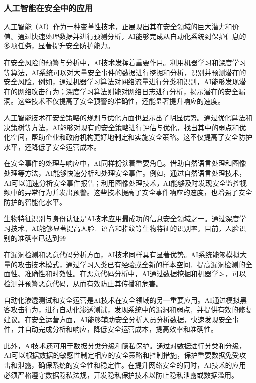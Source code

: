 \subsubsection{人工智能在安全中的应用}

人工智能（AI）作为一种变革性技术，正展现出其在安全领域的巨大潜力和价值。通过快速处理数据并进行预测分析，AI能够完成从自动化系统到保护信息的多项任务，显著提升安全防护能力。

在安全风险的预警与分析中，AI技术发挥着重要作用。利用机器学习和深度学习等算法，AI系统可以对大量安全事件的数据进行挖掘和分析，识别并预测潜在的安全风险。例如，通过机器学习算法对网络流量进行分类和识别，AI能够发现潜在的网络攻击行为；深度学习算法则能对网络日志进行分析，揭示潜在的安全漏洞。这些技术不仅提高了安全预警的准确性，还能显著提升响应的速度。

人工智能技术在安全策略的规划与优化方面也显示出了明显优势。通过优化算法和决策树等方法，AI能够对现有的安全策略进行评估与优化，找出其中的弱点和优化空间，帮助企业和政府机构更好地制定和实施安全策略。这不仅提高了安全防护水平，还降低了安全运营成本。

在安全事件的处理与响应中，AI同样扮演着重要角色。借助自然语言处理和图像处理等方法，AI能够快速分析和处理安全事件。例如，通过自然语言处理技术，AI可以迅速分析安全事件报告；利用图像处理技术，AI能够及时发现安全监控视频中的异常行为并发出预警。这些技术提高了安全事件响应的速度，也增强了安全防护的智能化水平。

生物特征识别与身份认证是AI技术应用最成功的信息安全领域之一。通过深度学习技术，AI能够显著提高人脸、语音和指纹等生物特征的识别率。目前，人脸识别的准确率已达到99%

在漏洞检测和恶意代码分析方面，AI技术同样具有显著优势。AI系统能够模拟大量的攻击技术模式，通过学习人类已有经验或全新的样本空间，提高漏洞检测的全面性、准确性和时效性。在恶意代码分析中，AI通过数据挖掘和机器学习，可以检测并预警恶意代码，从而有效防止其传播和危害。

自动化渗透测试和安全运营是AI技术在安全领域的另一重要应用。AI通过模拟黑客攻击行为，进行自动化渗透测试，发现系统中的漏洞和弱点，并提供有效的修复建议。在安全运营方面，AI能够辅助安全分析人员分析数据，快速发现安全事件，并自动完成分析和响应，降低安全运营成本，提高效率和准确性。

此外，AI技术还可用于数据分类分级和隐私保护。通过对数据进行分类和分级，AI可以根据数据的敏感性制定相应的安全策略和控制措施，保护重要数据免受攻击和泄露，确保系统的安全性和稳定性。在提升网络安全的同时，AI技术的应用必须严格遵守数据隐私法规，开发隐私保护技术以防止隐私泄露或数据滥用。

